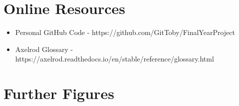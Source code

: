 \begin{appendices}
\chapter{Online Resources}\label{apndx:resources}
\begin{itemize}
    \item Personal GitHub Code - https://github.com/GitToby/FinalYearProject
    \item Axelrod Glossary - https://axelrod.readthedocs.io/en/stable/reference/glossary.html
\end{itemize}

\chapter{Further Figures}\label{apndx:figs}
\begin{figure}[ht]
    \centering
    \begin{minipage}{0.48\textwidth}
        \centering

\end{minipage}
\end{figure}
\end{appendices}
